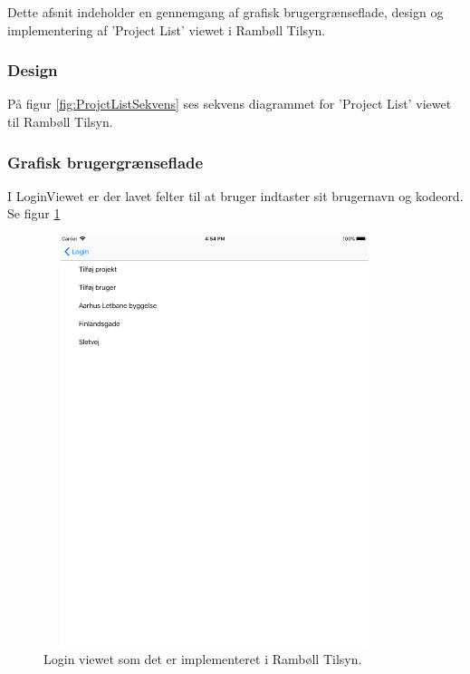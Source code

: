 Dette afsnit indeholder en gennemgang af grafisk brugergrænseflade, design og implementering af 'Project List' viewet i Rambøll Tilsyn.

\subsubsection{Design}
På figur \ref{fig:ProjctListSekvens} ses sekvens diagrammet for 'Project List' viewet til Rambøll Tilsyn.

\clearpage

\subsubsection{Grafisk brugergrænseflade}
I LoginViewet er der lavet felter til at bruger indtaster sit brugernavn og kodeord. Se figur \ref{fig:ProjectListView}
\begin{figure}[H] %
	\centering
	\includegraphics[height=12cm, width=10cm]{../ArkitekturDesign/Design/ProjectList/ProjectList}
	\caption{Login viewet som det er implementeret i Rambøll Tilsyn.}
	\label{fig:ProjectListView}
\end{figure}

